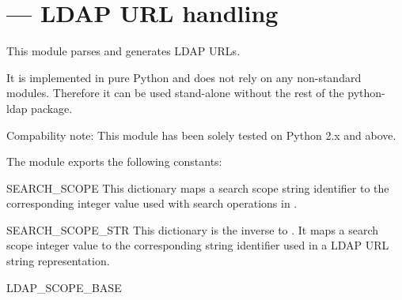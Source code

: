 

\section{ ---
         LDAP URL handling}






This module parses and generates LDAP URLs.

It is implemented in pure Python and does not rely on any
non-standard modules. Therefore it can be used stand-alone without
the rest of the python-ldap package.

Compability note: This module has been solely tested on Python 2.x and above.

The  module exports the following constants:

\begin{datadesc}{SEARCH_SCOPE}
  This dictionary maps a search scope string identifier
  to the corresponding integer value used with search operations
  in .
\end{datadesc}

\begin{datadesc}{SEARCH_SCOPE_STR}
  This dictionary is the inverse to . It
  maps a search scope integer value to the corresponding string identifier
  used in a LDAP URL string representation.
\end{datadesc}

\begin{datadesc}{LDAP_SCOPE_BASE}
  
\end{datadesc}

